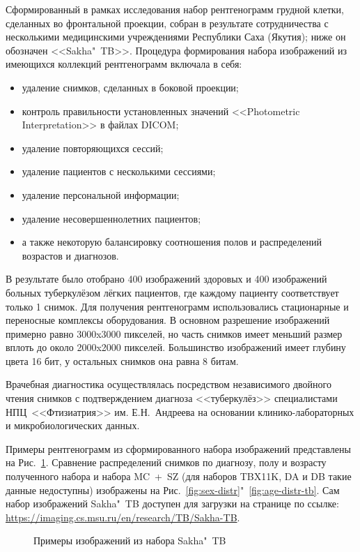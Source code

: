 Сформированный в рамках исследования набор рентгенограмм грудной клетки, сделанных во фронтальной проекции, собран в результате сотрудничества с несколькими медицинскими учреждениями Республики Саха (Якутия); ниже он обозначен <<Sakha"~TB>>. Процедура формирования набора изображений из имеющихся коллекций рентгенограмм включала в себя:

\begin{itemize}
	\item удаление снимков, сделанных в боковой проекции;
	\item контроль правильности установленных значений <<Photometric Interpretation>> в файлах DICOM;
	\item удаление повторяющихся сессий;
	\item удаление пациентов с несколькими сессиями;%
	\item удаление персональной информации;
	\item удаление несовершеннолетних пациентов;
	\item а также некоторую балансировку соотношения полов и распределений возрастов и диагнозов.
\end{itemize}

В результате было отобрано 400 изображений здоровых и 400 изображений больных туберкулёзом лёгких пациентов, где каждому пациенту соответствует только 1 снимок. Для получения рентгенограмм использовались стационарные и переносные комплексы оборудования. В основном разрешение изображений примерно равно 3000x3000 пикселей, но часть снимков имеет меньший размер вплоть до около 2000x2000 пикселей. Большинство изображений имеет глубину цвета 16 бит, у остальных снимков она равна 8 битам.

Врачебная диагностика осуществлялась посредством независимого двойного чтения снимков с подтверждением диагноза <<туберкулёз>> специалистами НПЦ~<<Фтизиатрия>> им. Е.Н.~Андреева на основании клинико-лабораторных и микробиологических данных.

Примеры рентгенограмм из сформированного набора изображений представлены на Рис.~\ref{fig:samples-yak-2}. Сравнение распределений снимков по диагнозу, полу и возрасту полученного набора и набора MC~+~SZ (для наборов TBX11K, DA и DB такие данные недоступны) изображены на Рис.~\ref{fig:sex-distr}"~\ref{fig:age-distr-tb}. Сам набор изображений Sakha"~TB доступен для загрузки на странице по ссылке: \url{https://imaging.cs.msu.ru/en/research/TB/Sakha-TB}.

\begin{figure}[ht]
	\caption{Примеры изображений из набора Sakha"~TB}
	\label{fig:samples-yak-2}
\end{figure}

